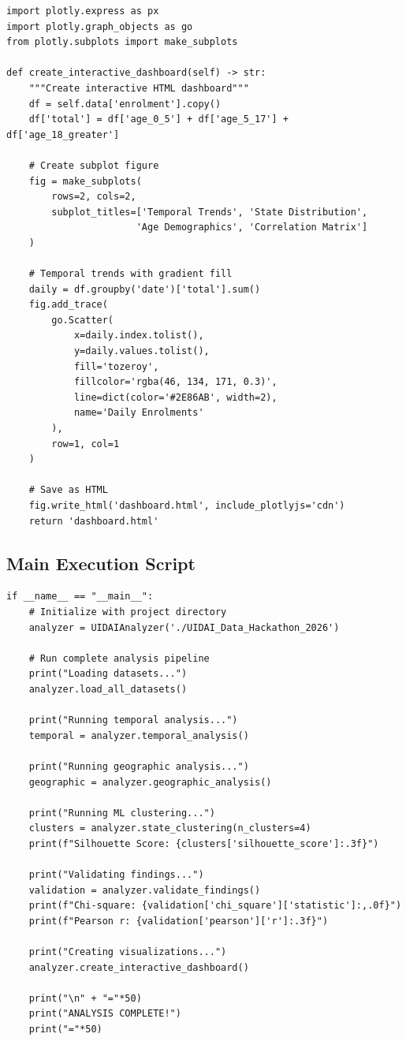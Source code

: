 \documentclass[12pt,a4paper]{article}
\begin{document}
\begin{lstlisting}[caption={Interactive Dashboard with Plotly}]
import plotly.express as px
import plotly.graph_objects as go
from plotly.subplots import make_subplots

def create_interactive_dashboard(self) -> str:
    """Create interactive HTML dashboard"""
    df = self.data['enrolment'].copy()
    df['total'] = df['age_0_5'] + df['age_5_17'] + df['age_18_greater']
    
    # Create subplot figure
    fig = make_subplots(
        rows=2, cols=2,
        subplot_titles=['Temporal Trends', 'State Distribution',
                       'Age Demographics', 'Correlation Matrix']
    )
    
    # Temporal trends with gradient fill
    daily = df.groupby('date')['total'].sum()
    fig.add_trace(
        go.Scatter(
            x=daily.index.tolist(),
            y=daily.values.tolist(),
            fill='tozeroy',
            fillcolor='rgba(46, 134, 171, 0.3)',
            line=dict(color='#2E86AB', width=2),
            name='Daily Enrolments'
        ),
        row=1, col=1
    )
    
    # Save as HTML
    fig.write_html('dashboard.html', include_plotlyjs='cdn')
    return 'dashboard.html'
\end{lstlisting}

\subsection{Main Execution Script}

\begin{lstlisting}[caption={Complete Pipeline Execution}]
if __name__ == "__main__":
    # Initialize with project directory
    analyzer = UIDAIAnalyzer('./UIDAI_Data_Hackathon_2026')
    
    # Run complete analysis pipeline
    print("Loading datasets...")
    analyzer.load_all_datasets()
    
    print("Running temporal analysis...")
    temporal = analyzer.temporal_analysis()
    
    print("Running geographic analysis...")
    geographic = analyzer.geographic_analysis()
    
    print("Running ML clustering...")
    clusters = analyzer.state_clustering(n_clusters=4)
    print(f"Silhouette Score: {clusters['silhouette_score']:.3f}")
    
    print("Validating findings...")
    validation = analyzer.validate_findings()
    print(f"Chi-square: {validation['chi_square']['statistic']:,.0f}")
    print(f"Pearson r: {validation['pearson']['r']:.3f}")
    
    print("Creating visualizations...")
    analyzer.create_interactive_dashboard()
    
    print("\n" + "="*50)
    print("ANALYSIS COMPLETE!")
    print("="*50)
\end{lstlisting}
\end{document}

